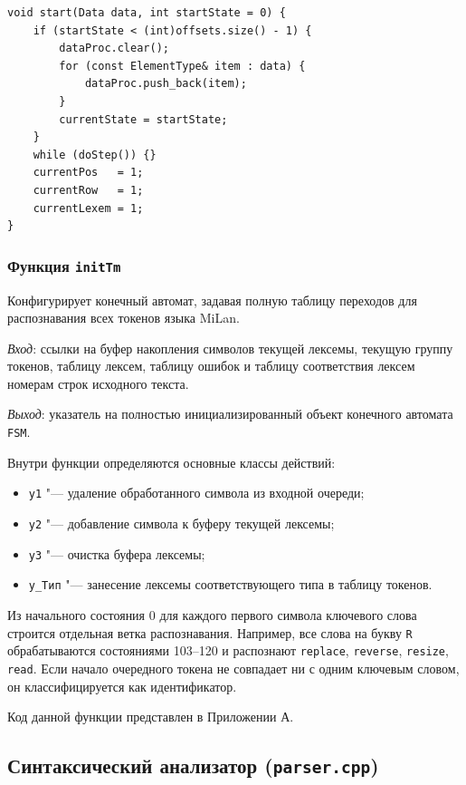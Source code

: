 \documentclass[a4paper,final]{article}
\begin{document}
\begin{lstlisting}[caption={Метод FSM::start}, label=lst:fsm_start]
void start(Data data, int startState = 0) {
    if (startState < (int)offsets.size() - 1) {
        dataProc.clear();
        for (const ElementType& item : data) {
            dataProc.push_back(item);
        }
        currentState = startState;
    }
    while (doStep()) {}
    currentPos   = 1;
    currentRow   = 1;
    currentLexem = 1;
}
\end{lstlisting}

\subsubsection*{Функция \texttt{initTm}}

Конфигурирует конечный автомат, задавая полную таблицу переходов для
распознавания всех токенов языка MiLan.

\textit{Вход}: ссылки на буфер накопления символов текущей лексемы, текущую
группу токенов, таблицу лексем, таблицу ошибок и таблицу соответствия
лексем номерам строк исходного текста.

\textit{Выход}: указатель на полностью инициализированный объект конечного
автомата \texttt{FSM}.

Внутри функции определяются основные классы действий:
\begin{itemize}
  \item \texttt{y1} "--- удаление обработанного символа из входной очереди;
  \item \texttt{y2} "--- добавление символа к буферу текущей лексемы;
  \item \texttt{y3} "--- очистка буфера лексемы;
  \item \texttt{y\_Тип} "--- занесение лексемы соответствующего типа в таблицу токенов.
\end{itemize}

Из начального состояния 0 для каждого первого символа ключевого слова
строится отдельная ветка распознавания. Например, все слова на букву
\texttt{R} обрабатываются состояниями 103--120 и распознают \texttt{replace},
\texttt{reverse}, \texttt{resize}, \texttt{read}. Если начало очередного токена не совпадает ни
с одним ключевым словом, он классифицируется как идентификатор.

Код данной функции представлен в Приложении А.


\subsection{Синтаксический анализатор (\texttt{parser.cpp})}
\end{document}
